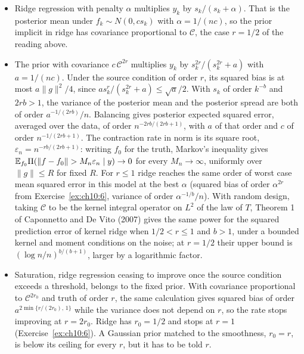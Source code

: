 \begin{itemize}
\item Ridge regression with penalty $\alpha$ multiplies $y_k$ by $s_k/(s_k + \alpha)$. That is the posterior mean under $f_k \sim N(0, cs_k)$ with $\alpha = 1/(nc)$, so the prior implicit in ridge has covariance proportional to $\mathcal{C}$, the case $r = 1/2$ of the reading above.
\item The prior with covariance $c\,\mathcal{C}^{2r}$ multiplies $y_k$ by $s_k^{2r}/(s_k^{2r} + a)$ with $a = 1/(nc)$. Under the source condition of order $r$, its squared bias is at most $a\|g\|^2/4$, since $as_k^{r}/(s_k^{2r} + a) \le \sqrt{a}/2$. With $s_k$ of order $k^{-b}$ and $2rb > 1$, the variance of the posterior mean and the posterior spread are both of order $a^{-1/(2rb)}/n$. Balancing gives posterior expected squared error, averaged over the data, of order $n^{-2rb/(2rb+1)}$, with $a$ of that order and $c$ of order $n^{-1/(2rb+1)}$. The contraction rate in norm is its square root, $\varepsilon_n = n^{-rb/(2rb+1)}$: writing $f_0$ for the truth, Markov's inequality gives $\mathbb{E}_{f_0}\Pi(\|f - f_0\| > M_n\varepsilon_n \mid y) \to 0$ for every $M_n \to \infty$, uniformly over $\|g\| \le R$ for fixed $R$. For $r \le 1$ ridge reaches the same order of worst case mean squared error in this model at the best $\alpha$ (squared bias of order $\alpha^{2r}$ from Exercise~\ref{ex:ch10:6}, variance of order $\alpha^{-1/b}/n$). With random design, taking $\mathcal{C}$ to be the kernel integral operator on $L^2$ of the law of $T$, Theorem 1 of Caponnetto and De Vito (2007) gives the same power for the squared prediction error of kernel ridge when $1/2 < r \le 1$ and $b > 1$, under a bounded kernel and moment conditions on the noise; at $r = 1/2$ their upper bound is $(\log n/n)^{b/(b+1)}$, larger by a logarithmic factor. 
\item Saturation, ridge regression ceasing to improve once the source condition exceeds a threshold, belongs to the fixed prior. With covariance proportional to $\mathcal{C}^{2r_0}$ and truth of order $r$, the same calculation gives squared bias of order $a^{2\min\{r/(2r_0),\,1\}}$ while the variance does not depend on $r$, so the rate stops improving at $r = 2r_0$. Ridge has $r_0 = 1/2$ and stops at $r = 1$ (Exercise~\ref{ex:ch10:6}). A Gaussian prior matched to the smoothness, $r_0 = r$, is below its ceiling for every $r$, but it has to be told $r$.

\end{itemize}
